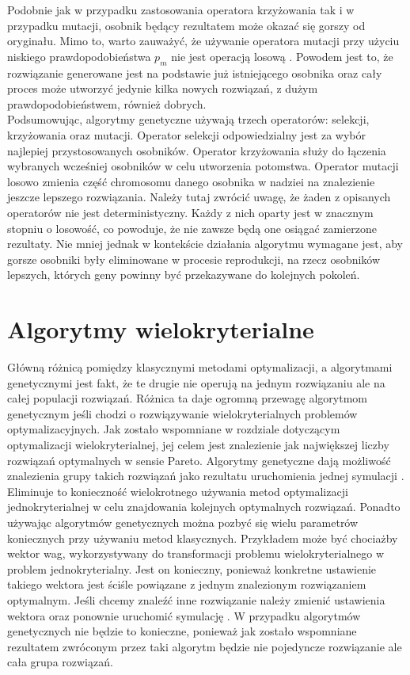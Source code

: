 \documentclass[twoside]{iisthesis}
\begin{document}
Podobnie jak w przypadku zastosowania operatora krzyżowania tak i w przypadku mutacji, osobnik będący rezultatem może okazać się gorszy od oryginału. Mimo to, warto zauważyć, że używanie operatora mutacji przy użyciu niskiego prawdopodobieństwa $p_{m}$ nie jest operacją losową \cite{book}. Powodem jest to, że rozwiązanie generowane jest na podstawie już istniejącego osobnika oraz cały proces może utworzyć jedynie kilka nowych rozwiązań, z dużym prawdopodobieństwem, również dobrych.\\

Podsumowując, algorytmy genetyczne używają trzech operatorów: selekcji, krzyżowania oraz mutacji. Operator selekcji odpowiedzialny jest za wybór najlepiej przystosowanych osobników. Operator krzyżowania służy do łączenia wybranych wcześniej osobników w celu utworzenia potomstwa. Operator mutacji losowo zmienia część chromosomu danego osobnika w nadziei na znalezienie jeszcze lepszego rozwiązania. Należy tutaj zwrócić uwagę, że żaden z opisanych operatorów nie jest deterministyczny. Każdy z nich oparty jest w znacznym stopniu o losowość, co powoduje, że nie zawsze będą one osiągać zamierzone rezultaty. Nie mniej jednak w kontekście działania algorytmu wymagane jest, aby gorsze osobniki były eliminowane w procesie reprodukcji, na rzecz osobników lepszych, których geny powinny być przekazywane do kolejnych pokoleń.
\section{Algorytmy wielokryterialne}
Główną różnicą pomiędzy klasycznymi metodami optymalizacji, a algorytmami genetycznymi jest fakt, że te drugie nie operują na jednym rozwiązaniu ale na całej populacji rozwiązań. Różnica ta daje ogromną przewagę algorytmom genetycznym jeśli chodzi o rozwiązywanie wielokryterialnych problemów optymalizacyjnych. Jak zostało wspomniane w rozdziale dotyczącym optymalizacji wielokryterialnej, jej celem jest znalezienie jak największej liczby rozwiązań optymalnych w sensie Pareto. Algorytmy genetyczne dają możliwość znalezienia grupy takich rozwiązań jako rezultatu uruchomienia jednej symulacji \cite{book}. Eliminuje to konieczność wielokrotnego używania metod optymalizacji jednokryterialnej w celu znajdowania kolejnych optymalnych rozwiązań. Ponadto używając algorytmów genetycznych można pozbyć się wielu parametrów koniecznych przy używaniu metod klasycznych. Przykładem może być chociażby wektor wag, wykorzystywany do transformacji problemu wielokryterialnego w problem jednokryterialny. Jest on konieczny, ponieważ konkretne ustawienie takiego wektora jest ściśle powiązane z jednym znalezionym rozwiązaniem optymalnym. Jeśli chcemy znaleźć inne rozwiązanie należy zmienić ustawienia wektora oraz ponownie uruchomić symulację \cite{book}. W przypadku algorytmów genetycznych nie będzie to konieczne, ponieważ jak zostało wspomniane rezultatem zwróconym przez taki algorytm będzie nie pojedyncze rozwiązanie ale cała grupa rozwiązań.
\end{document}
